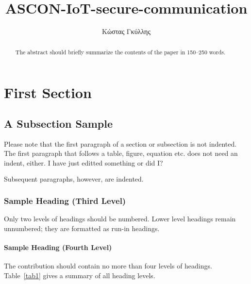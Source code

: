 \documentclass[runningheads]{llncs}
\begin{document}
%
\title{ASCON-IoT-secure-communication}
%
%
\author{Κώστας Γκύλλης}
%
%
%
\maketitle              %
%
\begin{abstract}
The abstract should briefly summarize the contents of the paper in
150--250 words.

\end{abstract}
%
%
%
\section{First Section}
\subsection{A Subsection Sample}
Please note that the first paragraph of a section or subsection is
not indented. The first paragraph that follows a table, figure,
equation etc. does not need an indent, either. I have just editted something or did I?

Subsequent paragraphs, however, are indented.

\subsubsection{Sample Heading (Third Level)} Only two levels of
headings should be numbered. Lower level headings remain unnumbered;
they are formatted as run-in headings.

\paragraph{Sample Heading (Fourth Level)}
The contribution should contain no more than four levels of
headings. Table~\ref{tab1} gives a summary of all heading levels.
\end{document}
